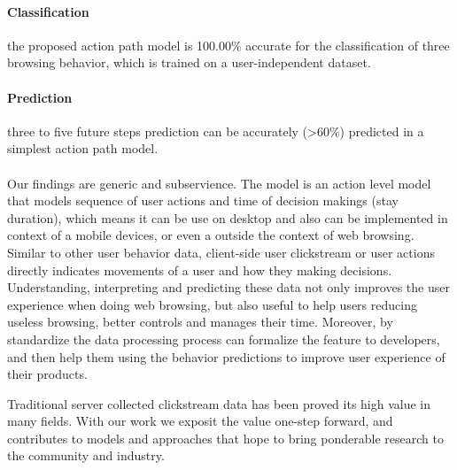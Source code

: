 \paragraph{Classification} the proposed action path model is 100.00\% accurate for 
the classification of three browsing behavior, which is trained on a user-independent dataset.
\paragraph{Prediction} three to five future steps prediction can be accurately (>60\%) predicted
in a simplest action path model.

\paragraph{}

Our findings are generic and subservience. The model is an action level model that models
sequence of user actions and time of decision makings (stay duration), which means it
can be use on desktop and also can be implemented in context of a mobile devices, 
or even a outside the context of web browsing.
Similar to other user behavior data, client-side user clickstream or user actions 
directly indicates movements of a user and how they making decisions. Understanding, 
interpreting and predicting these data not only improves the user experience when doing
web browsing, but also useful to help users reducing useless browsing, better controls 
and manages their time. Moreover, by standardize the data processing process can formalize
the feature to developers, and then help them using the behavior predictions to
improve user experience of their products.

Traditional server collected clickstream data has been proved its high value in many 
fields. With our work we exposit the value one-step forward, and contributes to models 
and approaches that hope to bring ponderable research to the community and industry.

\cleardoublepage